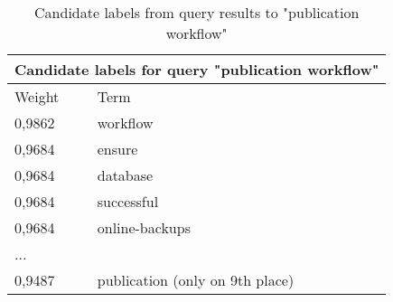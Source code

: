 \begin{table}[!ht]
\centering
\begin{tabular}{l l}
\hline
\multicolumn{2}{c}{Candidate labels for query "publication workflow"}\\
\hline
Weight & Term \\
\hline
0,9862 & workflow  \\
0,9684 & ensure  \\
0,9684 & database  \\
0,9684 & successful \\
0,9684 & online-backups \\
... & \\
0,9487 & publication (only on 9th place)\\
\hline
\end{tabular}
\caption[Candidate labels from query results to "publication workflow"]{Candidate labels from query results to "publication workflow"}
\end{table}
